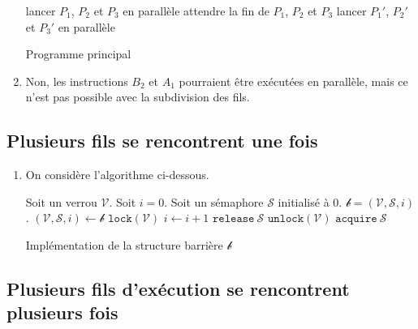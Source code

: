 \begin{enumerate}
		\begin{algorithm}[H]
			\centering
			\begin{algorithmic}[1]
				\State lancer $P_1$, $P_2$ et $P_3$ en parallèle
				\State attendre la fin de $P_1$, $P_2$ et $P_3$
				\State lancer $P_1'$, $P_2'$ et $P_3'$ en parallèle
			\end{algorithmic}
			\caption{Programme principal}
		\end{algorithm}

	\item Non, les instructions $B_2$ et $A_1$ pourraient être exécutées en parallèle, mais ce n'est pas possible avec la subdivision des fils.
\end{enumerate}

\subsection{Plusieurs fils se rencontrent une fois}

\begin{enumerate}[start=4]
	\item On considère l'algorithme ci-dessous.
		\begin{algorithm}[H]
			\centering
			\begin{algorithmic}[1]
				\State Soit un verrou $\mathcal{V}$.
				\State Soit $i = 0$.
				\State Soit un sémaphore $\mathcal{S}$ initialisé à $0$.
				\State\Return $\mathcal{b} = (\mathcal{V}, \mathcal{S}, i)$.
				\EndProcedure
				\State $(\mathcal{V}, \mathcal{S}, i) \gets \mathcal{b}$
				\State $\texttt{lock}(\mathcal{V})$
				\State $i \gets i + 1$
				\State $\texttt{release}\ \mathcal{S}$
				\EndFor
				\EndIf
				\State $\texttt{unlock}(\mathcal{V})$
				\State $\texttt{acquire}\ \mathcal{S}$
				\EndProcedure
			\end{algorithmic}
			\caption{Implémentation de la structure barrière $\mathcal{b}$}
		\end{algorithm}
\end{enumerate}

\subsection{Plusieurs fils d'exécution se rencontrent plusieurs fois}

